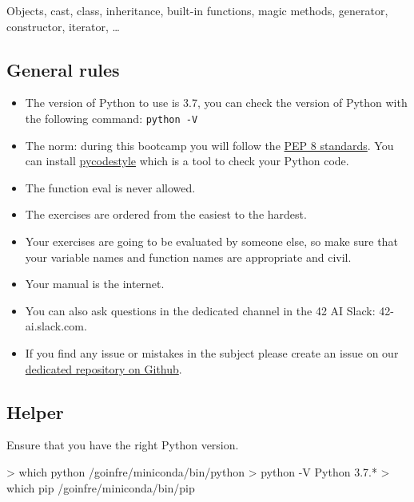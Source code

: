 \documentclass[]{article}
\newenvironment{Shaded}{\begin{snugshade}}{\end{snugshade}}
\newcommand{\NormalTok}[1]{\textcolor[rgb]{0.81,0.81,0.76}{#1}}
\begin{document}
Objects, cast, class, inheritance, built-in functions, magic methods,
generator, constructor, iterator, \ldots{}

\hypertarget{general-rules}{%
\subsection{General rules}\label{general-rules}}

\begin{itemize}
\item
  The version of Python to use is 3.7, you can check the version of
  Python with the following command: \texttt{python\ -V}
\item
  The norm: during this bootcamp you will follow the
  \href{https://www.python.org/dev/peps/pep-0008/}{PEP 8 standards}. You
  can install \href{https://pypi.org/project/pycodestyle}{pycodestyle}
  which is a tool to check your Python code.
\item
  The function eval is never allowed.
\item
  The exercises are ordered from the easiest to the hardest.
\item
  Your exercises are going to be evaluated by someone else, so make sure
  that your variable names and function names are appropriate and civil.
\item
  Your manual is the internet.
\item
  You can also ask questions in the dedicated channel in the 42 AI
  Slack: 42-ai.slack.com.
\item
  If you find any issue or mistakes in the subject please create an
  issue on our
  \href{https://github.com/42-AI/bootcamp_python/issues}{dedicated
  repository on Github}.
\end{itemize}

\hypertarget{helper}{%
\subsection{Helper}\label{helper}}

Ensure that you have the right Python version.

\begin{Shaded}
\begin{Highlighting}[]
\NormalTok{> which python}
\NormalTok{/goinfre/miniconda/bin/python}
\NormalTok{> python -V}
\NormalTok{Python 3.7.*}
\NormalTok{> which pip}
\NormalTok{/goinfre/miniconda/bin/pip}
\end{Highlighting}
\end{Shaded}
\end{document}
